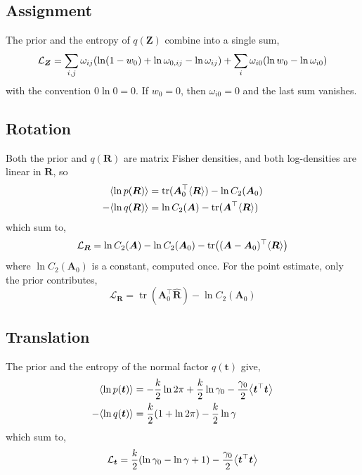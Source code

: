 \documentclass{article}
\newcommand{\lh}{\mathopen{}\mathclose\bgroup\left}
\newcommand{\rh}{\aftergroup\egroup\right}
\newcommand{\E}[1]{\lh\langle #1 \rh\rangle}
\newcommand{\m}[1]{\boldsymbol{#1}}
\DeclareMathOperator{\trace}{tr}
\begin{document}
\subsection{Assignment}
The prior and the entropy of $q(\m{Z})$ combine into a single sum,
\begin{equation}
\mathcal{L}_{\m{Z}} =
 \sum_{i,j} \omega_{ij} \lh(
   \ln (1 - w_0) + \ln \omega_{0,ij} - \ln \omega_{ij}
 \rh)
 + \sum_i \omega_{i0} \lh( \ln w_0 - \ln \omega_{i0} \rh)
\end{equation}
with the convention $0 \ln 0 = 0$. If $w_0 = 0$, then
$\omega_{i0} = 0$ and the last sum vanishes.

\subsection{Rotation}
Both the prior and $q(\m{R})$ are matrix Fisher densities, and both
log-densities are linear in $\m{R}$, so
\begin{equation}
\begin{aligned}
\E{\ln p(\m{R})} &=
 \trace(\m{A}_0^\top \E{\m{R}}) - \ln C_2(\m{A}_0)
\\
-\E{\ln q(\m{R})} &=
 \ln C_2(\m{A}) - \trace(\m{A}^\top \E{\m{R}})
\end{aligned}
\end{equation}
which sum to,
\begin{equation}
\mathcal{L}_{\m{R}} =
 \ln C_2(\m{A}) - \ln C_2(\m{A}_0)
 - \trace\lh( (\m{A} - \m{A}_0)^\top \E{\m{R}} \rh)
\end{equation}
where $\ln C_2(\m{A}_0)$ is a constant, computed once.
For the point estimate, only the prior contributes,
\begin{equation}
\mathcal{L}_{\m{R}} =
 \trace(\m{A}_0^\top \hat{\m{R}}) - \ln C_2(\m{A}_0)
\end{equation}

\subsection{Translation}
The prior and the entropy of the normal factor $q(\m{t})$ give,
\begin{equation}
\begin{aligned}
\E{\ln p(\m{t})} &=
 -\frac{k}{2} \ln 2\pi
 +\frac{k}{2} \ln \gamma_0
 -\frac{\gamma_0}{2} \E{\m{t}^\top \m{t}}
\\
-\E{\ln q(\m{t})} &=
 \frac{k}{2} \lh( 1 + \ln 2\pi \rh)
 -\frac{k}{2} \ln \gamma
\end{aligned}
\end{equation}
which sum to,
\begin{equation}
\mathcal{L}_{\m{t}} =
 \frac{k}{2} \lh( \ln \gamma_0 - \ln \gamma + 1 \rh)
 -\frac{\gamma_0}{2} \E{\m{t}^\top \m{t}}
\end{equation}
\end{document}
